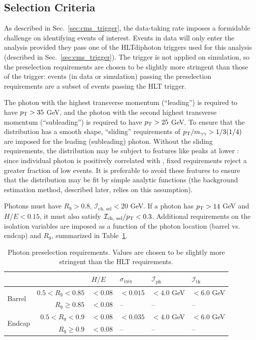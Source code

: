 \subsection{Selection Criteria} \label{sec:evt_photon_sel}
As described in Sec.~\ref{sec:cms_trigger}, the data-taking rate imposes a formidable challenge on identifying events of interest.
Events in data will only enter the analysis provided they pass one of the HLTdiphoton triggers used for this analysis (described in Sec.~\ref{sec:cms_trigger}).
The trigger is not applied on simulation, so the preselection requirements are chosen to be slightly more stringent than those of the trigger: events (in data or simulation) passing the preselection requirements are a subset of events passing the HLT trigger.

The photon with the highest transverse momentum (``leading'') is required to have $p_{\mathrm{T}} > 35$ GeV, and the photon with the second highest transverse momentum (``subleading'') is required to have $p_{\mathrm{T}} > 25$ GeV.
To ensure that the \mgg distribution has a smooth shape, ``sliding'' \pT requirements of $p_{\mathrm{T}}/m_{\gamma\gamma} > 1/3 (1/4)$ are imposed for the leading (subleading) photon.
Without the sliding \pT requirements, the \mgg distribution may be subject to features like peaks at lower \mgg: since individual photon \pT is positively correlated with \mgg, fixed \pT requirements reject a greater fraction of low \mgg events.
It is preferable to avoid these features to ensure that the \mgg distribution may be fit by simple analytic functions (the background estimation method, described later, relies on this assumption).

Photons must have $R_9 > 0.8$, $\mathcal I_{\text{ch, sel}} < 20$ GeV.
If a photon has $p_{\mathrm{T}} > 14$ GeV and $H/E < 0.15$, it must also satisfy $\mathcal I_{\text{ch, sel}}/p_{\mathrm{T}} < 0.3$.
Additional requirements on the isolation variables are imposed as a function of the photon location (barrel vs. endcap) and $R_9$, summarized in Table~\ref{tab:photon_presel}.
\begin{table} [h!]
    \centering
    \caption{Photon preselection requirements. Values are chosen to be slightly more stringent than the HLT requirements.}
    \begin{tabular}{ l r | l | l | l | l } \hline \hline
        & & $H/E$ & $\sigma_{i\eta i\eta}$ & $\mathcal I_{\text{ph}}$ & $\mathcal I_{\text{tk}}$  \\ \hline
        \multirow{2}{*}{Barrel} & $0.5 < R_9 < 0.85$ & $<0.08$ & $<0.015$ & $<4.0$ GeV & $<6.0$ GeV \\
                                & $R_9 \geq 0.85$ & $<0.08$ & -- & -- & -- \\ \hline
        \multirow{2}{*}{Endcap} & $0.5 < R_9 < 0.9$ & $<0.08$ & $<0.035$ & $<4.0$ GeV & $<6.0$ GeV \\
                                & $R_9 \geq 0.9$ & $<0.08$ & -- & -- & -- \\ \hline \hline 
    \end{tabular}
    \label{tab:photon_presel}
\end{table}
